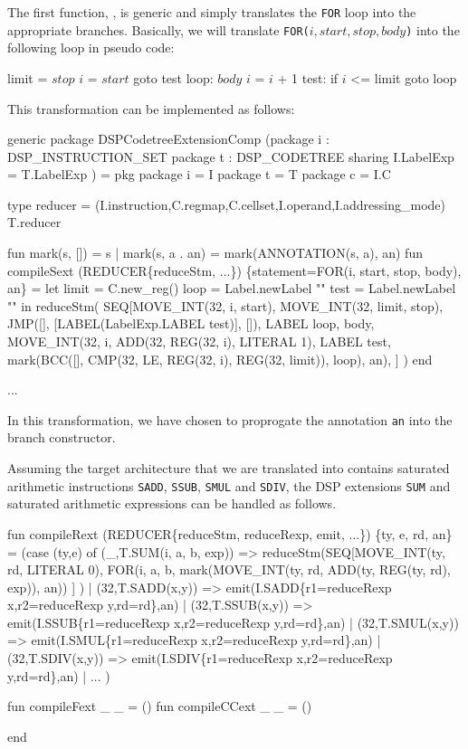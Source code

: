 The first function, , is generic and simply
translates the \verb|FOR| loop into the appropriate branches.
Basically, we will translate \verb|FOR(|$i,start,stop,body$\verb|)| into
the following loop in pseudo code:
\begin{SML}
        limit = \(stop\)
        \(i\)  = \(start\)
        goto test
  loop: \(body\)
        \(i\) = \(i\) + 1
  test: if \(i\) <= limit goto loop
\end{SML}
This transformation can be implemented as follows:
\begin{SML}
 generic package DSPCodetreeExtensionComp
    (package i : DSP_INSTRUCTION_SET
     package t : DSP_CODETREE
       sharing I.LabelExp = T.LabelExp
    ) =
 pkg
   package i = I
   package t = T
   package c = I.C

   type reducer = 
     (I.instruction,C.regmap,C.cellset,I.operand,I.addressing_mode) T.reducer
   
   fun mark(s, []) = s
     | mark(s, a . an) = mark(ANNOTATION(s, a), an)
   fun compileSext (REDUCER\{reduceStm, ...\}) 
      \{statement=FOR(i, start, stop, body), an\} =
   let limit = C.new_reg()
       loop  = Label.newLabel ""
       test  = Label.newLabel ""
   in  reduceStm(
         SEQ[MOVE_INT(32, i, start),
             MOVE_INT(32, limit, stop),
             JMP([], [LABEL(LabelExp.LABEL test)], []),
             LABEL loop,
             body,
             MOVE_INT(32, i, ADD(32, REG(32, i), LITERAL 1),
             LABEL test,
             mark(BCC([], 
                    CMP(32, LE, REG(32, i), REG(32, limit)), 
                      loop),
                  an),
            ]
      )
   end

   ...
\end{SML}
In this transformation, we have chosen to proprogate the annotation
\verb|an| into the branch constructor.

Assuming the target architecture that we are translated into contains
saturated arithmetic instructions \verb|SADD|, \verb|SSUB|, \verb|SMUL|
and \verb|SDIV|, the DSP extensions
\verb|SUM| and saturated arithmetic expressions can be handled as follows.
\begin{SML}
   fun compileRext (REDUCER\{reduceStm, reduceRexp, emit, ...\}) 
       \{ty, e, rd, an\} =
   (case (ty,e) of
      (_,T.SUM(i, a, b, exp)) =>
        reduceStm(SEQ[MOVE_INT(ty, rd, LITERAL 0),
                      FOR(i, a, b, 
                         mark(MOVE_INT(ty, rd, ADD(ty, REG(ty, rd), exp)), an))
                     ]
                 )
   | (32,T.SADD(x,y)) => emit(I.SADD\{r1=reduceRexp x,r2=reduceRexp y,rd=rd\},an)
   | (32,T.SSUB(x,y)) => emit(I.SSUB\{r1=reduceRexp x,r2=reduceRexp y,rd=rd\},an)
   | (32,T.SMUL(x,y)) => emit(I.SMUL\{r1=reduceRexp x,r2=reduceRexp y,rd=rd\},an)
   | (32,T.SDIV(x,y)) => emit(I.SDIV\{r1=reduceRexp x,r2=reduceRexp y,rd=rd\},an)
   | ...
   )

   fun compileFext _ _ = ()
   fun compileCCext _ _ = ()

  end
\end{SML}

